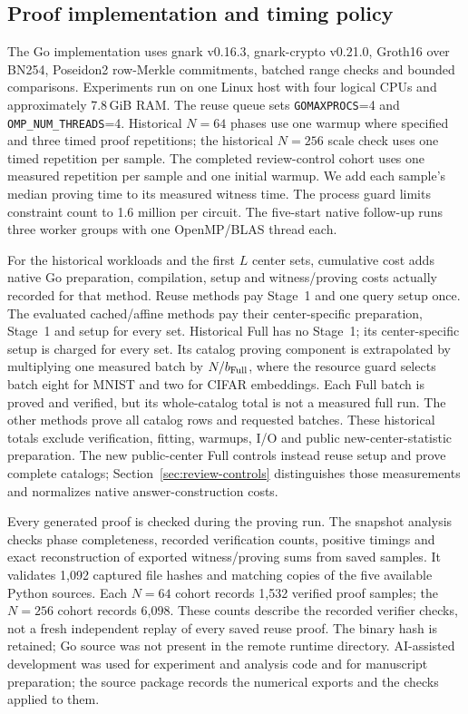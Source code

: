 \subsection{Proof implementation and timing policy}\label{sec:implementation}
The Go implementation uses gnark v0.16.3, gnark-crypto v0.21.0, Groth16 over BN254, Poseidon2 row-Merkle commitments, batched range checks and bounded comparisons. Experiments run on one Linux host with four logical CPUs and approximately 7.8\,GiB RAM. The reuse queue sets \texttt{GOMAXPROCS}=4 and \texttt{OMP\_NUM\_THREADS}=4. Historical $N=64$ phases use one warmup where specified and three timed proof repetitions; the historical $N=256$ scale check uses one timed repetition per sample. The completed review-control cohort uses one measured repetition per sample and one initial warmup. We add each sample's median proving time to its measured witness time. The process guard limits constraint count to 1.6 million per circuit. The five-start native follow-up runs three worker groups with one OpenMP/BLAS thread each.

For the historical workloads and the first $L$ center sets, cumulative cost adds native Go preparation, compilation, setup and witness/proving costs actually recorded for that method. Reuse methods pay Stage~1 and one query setup once. The evaluated cached/affine methods pay their center-specific preparation, Stage~1 and setup for every set. Historical Full has no Stage~1; its center-specific setup is charged for every set. Its catalog proving component is extrapolated by multiplying one measured batch by $N/b_{\rm Full}$, where the resource guard selects batch eight for MNIST and two for CIFAR embeddings. Each Full batch is proved and verified, but its whole-catalog total is not a measured full run. The other methods prove all catalog rows and requested batches. These historical totals exclude verification, fitting, warmups, I/O and public new-center-statistic preparation. The new public-center Full controls instead reuse setup and prove complete catalogs; Section~\ref{sec:review-controls} distinguishes those measurements and normalizes native answer-construction costs.

Every generated proof is checked during the proving run. The snapshot analysis checks phase completeness, recorded verification counts, positive timings and exact reconstruction of exported witness/proving sums from saved samples. It validates 1,092 captured file hashes and matching copies of the five available Python sources. Each $N=64$ cohort records 1,532 verified proof samples; the $N=256$ cohort records 6,098. These counts describe the recorded verifier checks, not a fresh independent replay of every saved reuse proof. The binary hash is retained; Go source was not present in the remote runtime directory. AI-assisted development was used for experiment and analysis code and for manuscript preparation; the source package records the numerical exports and the checks applied to them.

